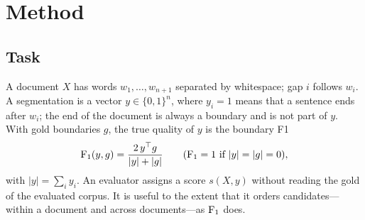 
\section{Method}
\label{sec:method}

\subsection{Task}
\label{sec:task}
A document $X$ has words $w_1,\dots,w_{n+1}$ separated by whitespace; gap $i$ follows $w_i$. A segmentation is a vector
$y \in \{0,1\}^n$, where $y_i = 1$ means that a sentence ends after $w_i$; the end of the document is always a boundary
and is not part of $y$. With gold boundaries $g$, the true quality of $y$ is the boundary F1
\begin{equation}
  \mathrm{F}_1(y, g) = \frac{2\, y^{\top} g}{|y| + |g|} \qquad (\mathrm{F}_1 = 1 \text{ if } |y| = |g| = 0),
  \label{eq:f1}
\end{equation}
with $|y| = \sum_i y_i$. An evaluator assigns a score $s(X, y)$ without reading the gold of the evaluated corpus. It is
useful to the extent that it orders candidates---within a document and across documents---as $\mathrm{F}_1$ does.

